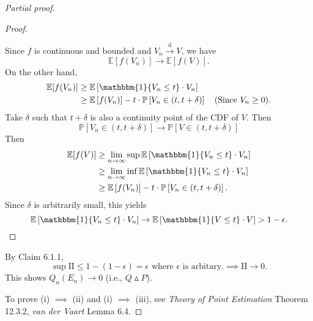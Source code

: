 \documentclass[a4paper]{article}
\begin{document}
\begin{proof}[Partial proof]
\begin{itemize}
\begin{proof}
\begin{center}
			\end{center}
			Since $f$ is continuous and bounded and $V_n \stackrel{\text{d}}{\longrightarrow} V$, we have
			\begin{equation*}
				\mathbb{E}[f(V_n)] \to \mathbb{E}[f(V)].
			\end{equation*}
			On the other hand,
			\begin{equation*}
				\begin{aligned}
					\mathbb{E}[f(V_n)] &\geq \mathbb{E}\left[\mathbbm{1}\{V_n \leq t\} \cdot V_n\right] \\
					&\geq \mathbb{E}\left[f(V_n)\right] - t \cdot \mathbb{P} \left[V_n \in (t,t+\delta)\right] \quad \text{(Since $V_n \geq 0$)}.
				\end{aligned}
			\end{equation*}
			Take $\delta$ such that $t+\delta$ is also a continuity point of the CDF of $V$. Then
			\begin{equation*}
				\mathbb{P}[V_n \in (t,t+\delta)] \to \mathbb{P}[V \in (t,t+\delta)]
			\end{equation*}
			Then
			\begin{equation*}
				\begin{aligned}
					\mathbb{E}[f(V)] &\geq \lim\limits_{n \to \infty} \sup \mathbb{E}\left[\mathbbm{1}\{V_n \leq t\} \cdot V_n\right] \\
					&\geq \lim\limits_{n \to \infty} \inf \mathbb{E}\left[\mathbbm{1}\{V_n \leq t\} \cdot V_n\right] \\
					&\geq \mathbb{E}\left[f(V_n)\right] - t \cdot \mathbb{P} \left[V_n \in (t,t+\delta)\right].
				\end{aligned}
			\end{equation*}
			Since $\delta$ is arbitrarily small, this yields
			\begin{equation*}
				\mathbb{E}\left[\mathbbm{1}\{V_n \leq t\} \cdot V_n\right] \to \mathbb{E}\left[\mathbbm{1}\{V \leq t\} \cdot V\right] > 1 - \epsilon.
			\end{equation*}
		\end{proof}
		By Claim 6.1.1, 
		\begin{equation*}
			\sup \text{II} \leq 1- (1-\epsilon) = \epsilon \text{ where } \epsilon \text{ is arbitary.} \implies \text{II} \to 0.
		\end{equation*}
		This shows $Q_n(E_n) \to 0$ (i.e., $Q \vartriangle P$).
	\end{itemize}
	To prove (i) $\implies$ (ii) and (i) $\implies$ (iii), see \emph{Theory of Point Estimation} Theorem 12.3.2, \emph{van der Vaart} Lemma 6.4.
\end{proof}
\end{document}

